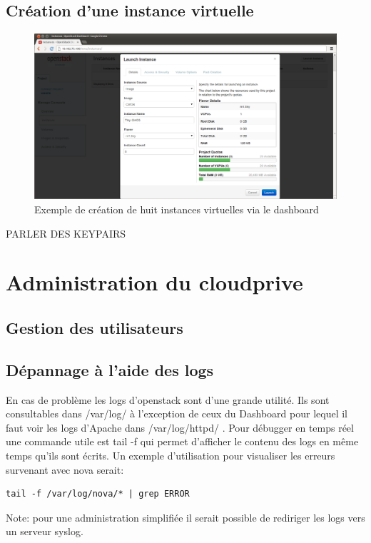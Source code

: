 \documentclass[a4paper,oneside]{report}
\begin{document}
\section{Création d'une instance virtuelle}
\begin{figure}[!h]
\centering
\includegraphics[resolution=200]{images/dashboard_create_details.png}
\caption{Exemple de création de huit instances virtuelles via le dashboard}
\end{figure}

PARLER DES KEYPAIRS

\chapter{Administration du \gls{cloudprive}}

\section{Gestion des utilisateurs}

\section{Dépannage à l'aide des logs}
En cas de problème les logs d'\gls{openstack} sont d'une grande utilité. Ils sont consultables dans /var/log/ à l'exception de ceux du Dashboard pour lequel il faut voir les logs d'Apache dans /var/log/httpd/ .
Pour débugger en temps réel une commande utile est tail -f qui permet d'afficher le contenu des logs en même temps qu'ils sont écrits.
Un exemple d'utilisation pour visualiser les erreurs survenant avec nova serait:
\begin{verbatim}
tail -f /var/log/nova/* | grep ERROR
\end{verbatim}

\noindent Note: pour une administration simplifiée il serait possible de rediriger les logs vers un serveur syslog.
\end{document}
